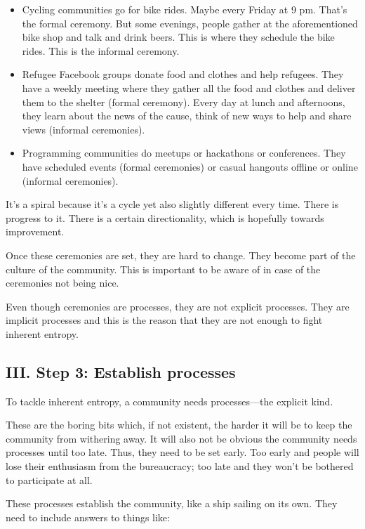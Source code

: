\begin{itemize}
    \item{Cycling communities go for bike rides. Maybe every Friday at 9 pm. That's the formal ceremony. But some evenings, people gather at the aforementioned bike shop and talk and drink beers. This is where they schedule the bike rides. This is the informal ceremony.}
    \item{Refugee Facebook groups donate food and clothes and help refugees. They have a weekly meeting where they gather all the food and clothes and deliver them to the shelter (formal ceremony). Every day at lunch and afternoons, they learn about the news of the cause, think of new ways to help and share views (informal ceremonies).}
    \item{Programming communities do meetups or hackathons or conferences. They have scheduled events (formal ceremonies) or casual hangouts offline or online (informal ceremonies).}
\end{itemize}

It’s a spiral because it’s a cycle yet also slightly different every time. There is progress to it. There is a certain directionality, which is hopefully towards improvement.

Once these ceremonies are set, they are hard to change. They become part of the culture of the community. This is important to be aware of in case of the ceremonies not being nice.

Even though ceremonies are processes, they are not explicit processes. They are implicit processes and this is the reason that they are not enough to fight inherent entropy.

\subsection{III. Step 3: Establish processes}

To tackle inherent entropy, a community needs processes—the explicit kind.

These are the boring bits which, if not existent, the harder it will be to keep the community from withering away. It will also not be obvious the community needs processes until too late. Thus, they need to be set early. Too early and people will lose their enthusiasm from the bureaucracy; too late and they won’t be bothered to participate at all.

These processes establish the community, like a ship sailing on its own. They need to include answers to things like:

